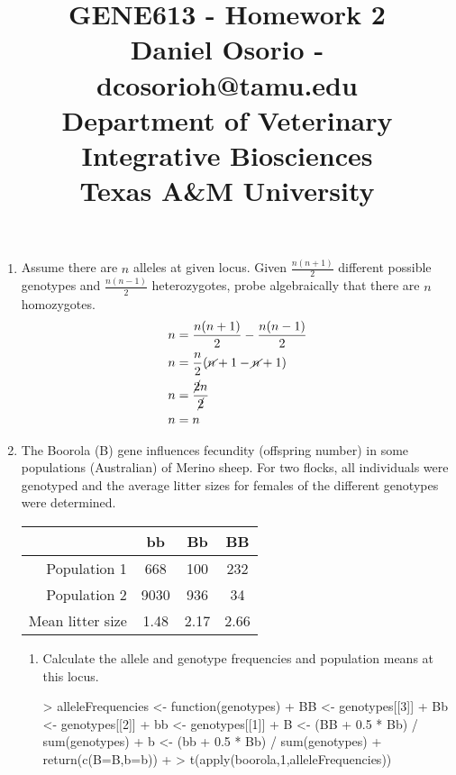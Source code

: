\documentclass[12pt,a4paper]{paper}
\begin{document}
\title{GENE613 - Homework 2\\\small{Daniel Osorio - dcosorioh@tamu.edu\\Department of Veterinary Integrative Biosciences\\Texas A\&M University}}
\maketitle

\begin{enumerate}
\item Assume there are $n$ alleles at given locus. Given $\frac{n(n+1)}{2}$ different possible genotypes and $\frac{n(n-1)}{2}$ heterozygotes, probe algebraically that there are $n$ homozygotes.
\begin{equation}
\begin{split}
n & = \frac{n(n+1)}{2} - \frac{n(n-1)}{2}\\
n & =  \frac{n}{2}(\cancel{n}+1-\cancel{n}+1) \\
n & =  \frac{\cancel{2}n}{\cancel{2}} \\
n & =  n
\end{split}
\end{equation}
\item The Boorola (B) gene influences fecundity (offspring number) in some populations (Australian) of Merino sheep. For two flocks, all individuals were genotyped and the average litter sizes for females of the different genotypes were determined.
\begin{center}
\begin{tabular}{|r|c|c|c|}
\hline
& bb & Bb & BB\\
\hline
Population 1&668&100&232\\
\hline
Population 2&9030&936&34\\
\hline
\hline
Mean litter size&1.48&2.17&2.66\\
\hline
\end{tabular}
\end{center}
\begin{enumerate}
\item Calculate the allele and genotype frequencies and population means at this locus.
\begin{Schunk}
\begin{Sinput}
> alleleFrequencies <- function(genotypes){
+   BB <- genotypes[[3]]
+   Bb <- genotypes[[2]]
+   bb <- genotypes[[1]]
+   B <- (BB + 0.5 * Bb) / sum(genotypes)
+   b <- (bb + 0.5 * Bb) / sum(genotypes)
+   return(c(B=B,b=b))
+ }
> t(apply(boorola,1,alleleFrequencies))

\end{Sinput}
\end{Schunk}
\end{enumerate}
\end{enumerate}
\end{document}
